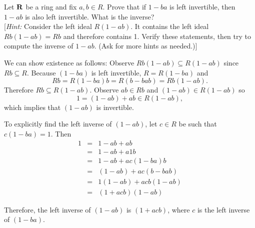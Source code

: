 \begin{problem}
Let $\mathbf{R}$ be a ring and fix $a, b \in R$.  Prove that if $1 - ba$ is left
invertible, then $1 - ab$ is also left invertible.  What is the inverse?\\[4pt]
[{\it Hint:} Consider the left ideal $R(1 - ab)$.  It contains the left ideal $Rb(1-ab) = Rb$ and therefore contains 1. Verify these statements, then try to compute the inverse of $1-ab$. (Ask for more hints as needed.)] 
\end{problem}
\smallskip
\begin{solution}
We can show existence as follows: 
Observe $Rb(1-ab)\subseteq R(1-ab)$ since $Rb\subseteq R$.  Because $(1-ba)$ is left invertible, $R = R(1-ba)$ and
\[Rb=R(1-ba)b=R(b-bab)=Rb(1-ab).\] Therefore $Rb\subseteq R(1-ab)$. Observe $ab\in Rb$ and $(1-ab)\in R(1-ab)$ so \[1=(1-ab)+ab\in R(1-ab),\] which implies that $(1-ab)$ is invertible.


To explicitly find the left inverse of $(1-ab)$, let $c \in R$ be such that $c(1-ba) = 1$. Then
\begin{eqnarray*}
1 & = & 1 - ab + ab\\
& = & 1 - ab + a1b\\
& = & 1 - ab + ac(1-ba)b\\
& = & (1 - ab) + ac(b-bab)\\
& = & 1(1 - ab) + acb(1-ab)\\
& = & (1+acb)(1-ab)
\end{eqnarray*}

Therefore, the left inverse of $(1-ab)$ is $(1+acb)$, where $c$ is the left inverse of $(1-ba)$.



\end{solution}
\probskip




